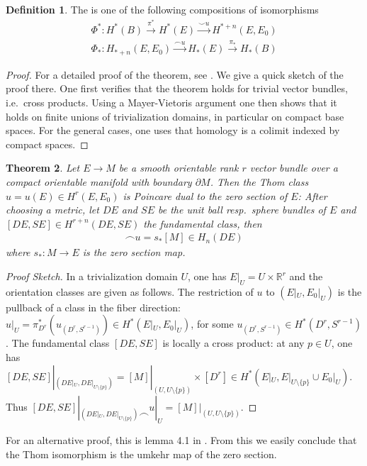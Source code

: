 \documentclass{scrartcl}
\let\emph\relax
\newcommand{\emphi}[1]{\index{#1}\emph{#1}}
\theoremstyle{plain}
\newtheorem{theorem}{Theorem}[section]
\theoremstyle{definition}
\newtheorem{definition}[theorem]{Definition}
\newcommand{\R}{\mathbb R}
\newcommand{\union}{\mathbin{\cup}}
\newcommand{\capp}{\mathbin{\frown}}
\newcommand{\cupp}{\mathbin{\smile}}
\begin{document}
\begin{definition}
The \emphi{Thom isomorphism} is one of the following compositions of isomorphisms
\begin{align*}
    \Phi^*\colon H^*(B)\xrightarrow{\pi^*}H^*(E)\xrightarrow{\cupp u}H^{*+n}(E, E_0) \\
    \Phi_*\colon H_{*+n}(E, E_0) \xrightarrow{\capp u} H_*(E)\xrightarrow{\pi_*}H_*(B)
\end{align*}
\end{definition}

\begin{proof}
For a detailed proof of the theorem, see \cite{milnor1974characteristic}. We give a quick sketch of the proof there. One first verifies that the theorem holds for trivial vector bundles, i.e.\ cross products. Using a Mayer-Vietoris argument one then shows that it holds on finite unions of trivialization domains, in particular on compact base spaces. For the general cases, one uses that homology is a colimit indexed by compact spaces.
\end{proof}

\begin{theorem}\label{thm:thom_class_dual}
    Let $E\to M$ be a smooth orientable rank $r$ vector bundle over a compact orientable manifold with boundary $\partial M$. Then the Thom class $u=u(E)\in H^r(E, E_0)$ is Poincare dual to the zero section of $E$: After choosing a metric, let $DE$ and $SE$ be the unit ball resp.\ sphere bundles of $E$ and $[DE, SE]\in H^{r+n}(DE, SE)$ the fundamental class, then
    \begin{align*}
        [DE, SE] \capp u = s_*[M]\in H_n(DE)
    \end{align*}
    where $s_*\colon M\to E$ is the zero section map.
\end{theorem}
\begin{proof}[Proof Sketch]
    In a trivialization domain $U$, one has $E|_U = U \times \R^r$ and the orientation classes are given as follows. The restriction of $u$ to $(E|_U, E_0|_U)$ is the pullback of a class in the fiber direction: $u|_U = \pi_{D^r}^{*}\left(u_{(D^r, S^{r-1})}\right)\in H^*(E|_U, E_0|_U)$, for some $u_{(D^r, S^{r-1})}\in H^*(D^r, S^{r-1})$. The fundamental class $[DE, SE]$ is locally a cross product: at any $p\in U$, one has $[DE, SE]|_{(DE|_U, DE|_{U\setminus\{p\}})} = [M]|_{(U, U\setminus\{p\})} \times [D^r] \in H^*(E|_U, E|_{U\setminus\{p\}} \union E_0|_{U})$. Thus $[DE, SE]|_{(DE|_U, DE|_{U\setminus\{p\}})} \capp u|_U = [M]|_{(U, U\setminus\{p\})}$.
\end{proof}
For an alternative proof, this is lemma 4.1 in \cite{hutchings2011cup}. From this we easily conclude that the Thom isomorphism is the umkehr map of the zero section. 
\end{document}
